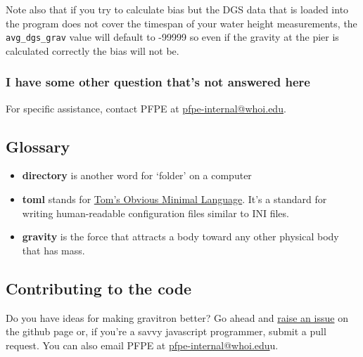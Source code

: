 \documentclass{pfpe-manual}
\begin{document}
Note also that if you try to calculate bias but the DGS data that is loaded into the program does not cover the timespan of your water height measurements, the \texttt{avg\_dgs\_grav} value will default to -99999 so even if the gravity at the pier is calculated correctly the bias will not be.

\subsubsection{I have some other question that's not answered here}
For specific assistance, contact PFPE at \href{mailto:pfpe-internal@whoi.edu}{pfpe-internal@whoi.edu}.

\subsection{Glossary}
\begin{itemize}
\item \textbf{directory} is another word for `folder' on a computer
\item \textbf{toml} stands for \href{https://toml.io/}{Tom's Obvious Minimal Language}. It's a standard for writing human-readable configuration files similar to INI files.
\item \textbf{gravity} is the force that attracts a body toward any other physical body that has mass.
\end{itemize}

\subsection{Contributing to the code}
Do you have ideas for making gravitron better? Go ahead and \href{https://github.com/hfmark/gravitron/issues}{raise an issue} on the github page or, if you're a savvy javascript programmer, submit a pull request. You can also email PFPE at \href{mailto:pfpe-internal@whoi.edu}{pfpe-internal@whoi.edu}u.
\end{document}
